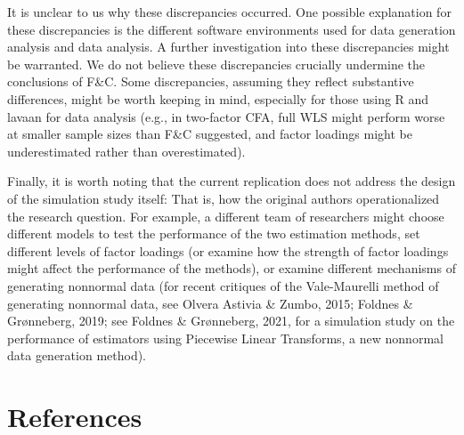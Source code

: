 \documentclass[10,a4paperpaper,]{article}
\begin{document}
It is unclear to us why these discrepancies occurred. One possible
explanation for these discrepancies is the different software
environments used for data generation analysis and data analysis. A
further investigation into these discrepancies might be warranted. We do
not believe these discrepancies crucially undermine the conclusions of
F\&C. Some discrepancies, assuming they reflect substantive differences,
might be worth keeping in mind, especially for those using R and lavaan
for data analysis (e.g., in two-factor CFA, full WLS might perform worse
at smaller sample sizes than F\&C suggested, and factor loadings might
be underestimated rather than overestimated).

Finally, it is worth noting that the current replication does not
address the design of the simulation study itself: That is, how the
original authors operationalized the research question. For example, a
different team of researchers might choose different models to test the
performance of the two estimation methods, set different levels of
factor loadings (or examine how the strength of factor loadings might
affect the performance of the methods), or examine different mechanisms
of generating nonnormal data (for recent critiques of the Vale-Maurelli
method of generating nonnormal data, see Olvera Astivia \& Zumbo, 2015;
Foldnes \& Grønneberg, 2019; see Foldnes \& Grønneberg, 2021, for a
simulation study on the performance of estimators using Piecewise Linear
Transforms, a new nonnormal data generation method).

\section*{References}
\end{document}
